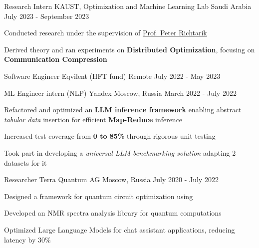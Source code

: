 
\begin{cventries}
  \cventry
    {Research Intern}
    {KAUST, Optimization and Machine Learning Lab}
    {Saudi Arabia}
    {July 2023 - September 2023}
    {
      \begin{cvitems}
        \item {Conducted research under the supervision of  \href{https://richtarik.org/}{Prof. Peter Richtarik}}
        \item {Derived theory and ran experiments on \textbf{Distributed Optimization}, focusing on \textbf{Communication Compression}}
      \end{cvitems}
    }

  \cventry
    {Software Engineer}
    {Eqvilent (HFT fund)}
    {Remote}
    {July 2022 - May 2023}
    {}

  \cventry
    {ML Engineer intern (NLP)}
    {Yandex}
    {Moscow, Russia}
    {March 2022 - July 2022}
    {
      \begin{cvitems} %
        \item {Refactored and optimized an \textbf{LLM inference framework} 
        enabling abstract \textit{tabular data} insertion for efficient \textbf{Map-Reduce} inference}
        \item {Increased test coverage from \textbf{0 to 85\%} through rigorous unit testing}
        \item {Took part in developing a \textit{universal LLM benchmarking solution} adapting 2 datasets for it}
      \end{cvitems}
    }
    
  \cventry
    {Researcher} %
    {Terra Quantum AG} %
    {Moscow, Russia} %
    {July 2020 - July 2022} %
    {
      \begin{cvitems} %
        \item {Designed a framework for quantum circuit optimization using}
        \item {Developed an NMR spectra analysis library for quantum computations}
        \item {Optimized Large Language Models for chat assistant applications, reducing latency by 30\%}
      \end{cvitems}
    }
    
\end{cventries}

